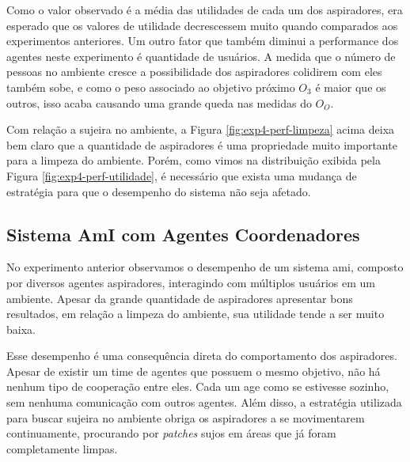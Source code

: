 Como o valor observado é a média das utilidades de cada um dos aspiradores, era esperado que os valores de utilidade decrescessem muito quando comparados aos experimentos anteriores. Um outro fator que também diminui a performance dos agentes neste experimento é quantidade de usuários. A medida que o número de pessoas no ambiente cresce a possibilidade dos aspiradores colidirem com eles também sobe, e como o peso associado ao objetivo próximo $O_3$ é maior que os outros, isso acaba causando uma grande queda nas medidas do $O_O$.

\begin{figure}[h!]
    \centering
\end{figure}

Com relação a sujeira no ambiente, a Figura \ref{fig:exp4-perf-limpeza} acima deixa bem claro que a quantidade de aspiradores é uma propriedade muito importante para a limpeza do ambiente. Porém, como vimos na distribuição exibida pela Figura \ref{fig:exp4-perf-utilidade}, é necessário que exista uma mudança de estratégia para que o desempenho do sistema não seja afetado. 

\subsection{Sistema AmI com Agentes Coordenadores}
\label{sec:exp-coord}

No experimento anterior observamos o desempenho de um sistema \acrshort{ami}, composto por diversos agentes aspiradores, interagindo com múltiplos usuários em um ambiente. Apesar da grande quantidade de aspiradores apresentar bons resultados, em relação a limpeza do ambiente, sua utilidade tende a ser muito baixa. 

Esse desempenho é uma consequência direta do comportamento dos aspiradores. Apesar de existir um time de agentes que possuem o mesmo objetivo, não há nenhum tipo de cooperação entre eles. Cada um age como se estivesse sozinho, sem nenhuma comunicação com outros agentes. Além disso, a estratégia utilizada para buscar sujeira no ambiente obriga os aspiradores a se movimentarem continuamente, procurando por \textit{patches} sujos em áreas que já foram completamente limpas. 

